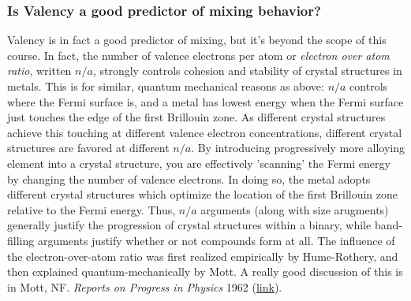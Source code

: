 \documentclass[12pt]{article}
\begin{document}
\subsubsection{Is Valency a good predictor of mixing behavior?}
Valency is in fact a good predictor of mixing, but it's beyond the scope of this course. In fact, the number of valence electrons per atom or \emph{electron over atom ratio}, written $n/a$, strongly controls cohesion and stability of crystal structures in metals. This is for similar, quantum mechanical reasons as above: $n/a$ controls where the Fermi surface is, and a metal has lowest energy when the Fermi surface just touches the edge of the first Brillouin zone. As different crystal structures achieve this touching at different valence electron concentrations, different crystal structures are favored at different $n/a$. By introducing progressively more alloying element into a crystal structure, you are effectively 'scanning' the Fermi energy by changing the number of valence electrons. In doing so, the metal adopts different crystal structures which optimize the location of the first Brillouin zone relative to the Fermi energy. Thus, $n/a$ arguments (along with size arugments) generally justify the progression of crystal structures within a binary, while band-filling arguments justify whether or not compounds form at all. The influence of the electron-over-atom ratio was first realized empirically by Hume-Rothery, and then explained quantum-mechanically by Mott. A really good discussion of this is in Mott, NF. \textit{Reports on Progress in Physics} 1962 (\href{http://dx.doi.org/10.1088/0034-4885/25/1/306}{link}).
\end{document}
